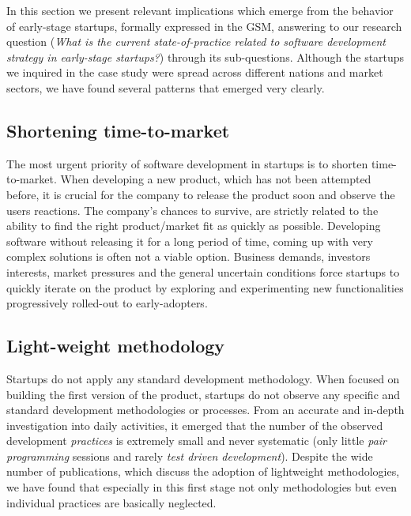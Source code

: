\documentclass[10pt,journal,letterpaper,compsoc]{IEEEtran}
\begin{document}
In this section we present relevant implications which emerge from the behavior
of early-stage startups, formally expressed in the GSM, answering to our
research question (\textit{What is the current state-of-practice related to
software development strategy in early-stage startups?}) through its 
sub-questions. Although the startups we inquired in the case study were spread
across different nations and market sectors, we have found several patterns
that emerged very clearly.

\subsection{Shortening time-to-market}

The most urgent priority of software development in startups is to shorten
time-to-market. When developing a new product, which has not been attempted
before, it is crucial for the company to release the product soon and observe
the users reactions. The company's chances to survive, are strictly related to
the ability to find the right product/market fit as quickly as possible.
Developing software without releasing it for a long period of time, coming up
with very complex solutions is often not a viable option. Business demands,
investors interests, market pressures and the general uncertain conditions force
startups to quickly iterate on the product by exploring and experimenting new
functionalities progressively rolled-out to early-adopters. 



\subsection{Light-weight methodology} 
Startups do not apply any standard development methodology. When focused on 
building the first version of the product, startups do not observe any 
specific and standard development methodologies or processes. From an accurate 
and in-depth investigation into daily activities, it emerged that the number of 
the observed development \textit{practices} is extremely small and never 
systematic (only little \textit{pair programming} sessions and rarely 
\textit{test driven development}). Despite the wide number of publications, 
which discuss the adoption of lightweight methodologies, we have found that 
especially in this first stage not only methodologies but even individual 
practices are basically neglected.
\end{document}
